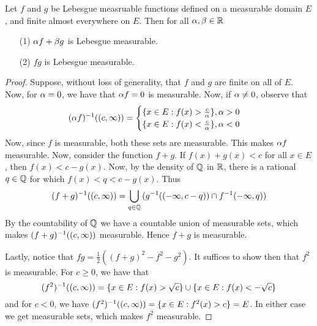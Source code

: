 \begin{theorem}\label{9.1.5}
    Let $f$ and  $g$ be Lebesgue measruable functions defined on a measurable
    domain $E$, and finite almost everywhere on  $E$. Then for all  $\alpha, \beta \in
    \mathbb{R}$
    \begin{enumerate}
        \item[(1)] $\alpha{f}+\beta{g}$ is Lebesgue measurable.

        \item[(2)] $fg$ is Lebesgue measurable.
    \end{enumerate}
\end{theorem}
\begin{proof}
    Suppose, without loss of generality, that $f$ and  $g$ are finite on all of
     $E$. Now, for $\alpha=0$, we have that $\alpha{f}=0$ is measurable. Now, if $\alpha
     \neq 0$, observe that
     \begin{equation*}
         (\alpha{f})^{-1}((c,\infty))= \begin{cases}
                                    \{x \in E : f(x)>\frac{c}{\alpha}\}, \alpha>0   \\
                                    \{x \in E : f(x)<\frac{c}{\alpha}\}, \alpha<0   \\
                                \end{cases}
     \end{equation*}
     Now, since $f$ is measurable, both these sets are measurable. This makes
     $\alpha{f}$ measurable. Now, consider the function $f+g$. If  $f(x)+g(x)<c$ for
     all $x \in E$, then  $f(x)<c-g(x)$. Now, by the density of $\mathbb{Q}$ in  $\mathbb{R}$,
     there is a rational  $q \in \mathbb{Q}$ for which  $f(x)<q<c-g(x)$. Thus
     \begin{equation*}
         (f+g)^{-1}((c,\infty))=\bigcup_{q \in \mathbb{Q}}{(g^{-1}((-\infty,c-q)) \cap
         f^{-1}(-\infty,q))}
     \end{equation*}
     By the countability of $\mathbb{Q}$ we have a countable union of measurable sets,
     which makes $(f+g)^{-1}((c,\infty))$ measurable. Hence $f+g$ is
     measurable.

     Lastly, notice that $fg=\frac{1}{2}((f+g)^2-f^2-g^2)$. It suffices to show
     then that $f^2$ is measurable. For  $c \geq 0$, we have that
     \begin{equation*}
         (f^2)^{-1}((c,\infty))=\{x \in E : f(x)>\sqrt{c}\} \cup \{x \in E :
         f(x)<-\sqrt{c}\}
     \end{equation*}
     and for $c<0$, we have  $(f^2)^{-1}((c,\infty))=\{x \in E : f^2(x)>c\}=E$.
     In either case we get measurable sets, which makes $f^2$ measurable.
\end{proof}

